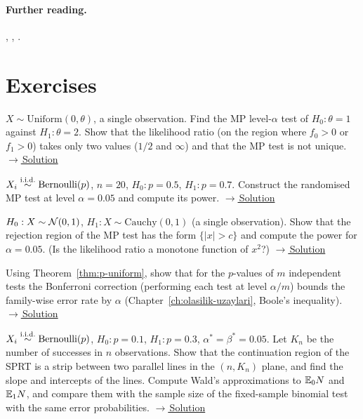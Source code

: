 \documentclass[main.tex]{subfiles}
\begin{document}
\paragraph{Further reading.} \cite[Chapter~8]{casella}, \cite[Chapter~3]{lehmann-romano}, \cite[Chapter~10]{wasserman}.

\section{Exercises}

\begin{exercise}\label{exr:13-1}
$X\sim\text{Uniform}(0,\theta)$, a single observation. Find the MP level-$\alpha$ test of $H_0:\theta=1$ against $H_1:\theta=2$. Show that the likelihood ratio (on the region where $f_0>0$ or $f_1>0$) takes only two values ($1/2$ and $\infty$) and that the MP test is not unique.
\hfill\hyperref[coz:13-1]{\footnotesize$\rightarrow$\,Solution}
\end{exercise}

\begin{exercise}\label{exr:13-2}
$X_i\overset{\text{i.i.d.}}{\sim}\text{Bernoulli}(p)$, $n=20$, $H_0:p=0.5$, $H_1:p=0.7$. Construct the randomised MP test at level $\alpha=0.05$ and compute its power.
\hfill\hyperref[coz:13-2]{\footnotesize$\rightarrow$\,Solution}
\end{exercise}

\begin{exercise}\label{exr:13-3}
$H_0:X\sim\mathcal{N}(0,1)$, $H_1:X\sim\text{Cauchy}(0,1)$ (a single observation). Show that the rejection region of the MP test has the form $\{|x|>c\}$ and compute the power for $\alpha=0.05$. (Is the likelihood ratio a monotone function of $x^2$?)
\hfill\hyperref[coz:13-3]{\footnotesize$\rightarrow$\,Solution}
\end{exercise}

\begin{exercise}\label{exr:13-4}
Using Theorem~\ref{thm:p-uniform}, show that for the $p$-values of $m$ independent tests the Bonferroni correction (performing each test at level $\alpha/m$) bounds the family-wise error rate by $\alpha$ (Chapter~\ref{ch:olasilik-uzaylari}, Boole's inequality).
\hfill\hyperref[coz:13-4]{\footnotesize$\rightarrow$\,Solution}
\end{exercise}

\begin{exercise}\label{exr:13-5}
$X_i\overset{\text{i.i.d.}}{\sim}\text{Bernoulli}(p)$, $H_0:p=0.1$, $H_1:p=0.3$, $\alpha^*=\beta^*=0.05$. Let $K_n$ be the number of successes in $n$ observations. Show that the continuation region of the SPRT is a strip between two parallel lines in the $(n,K_n)$ plane, and find the slope and intercepts of the lines. Compute Wald's approximations to $\mathbb{E}_0N$ and $\mathbb{E}_1N$, and compare them with the sample size of the fixed-sample binomial test with the same error probabilities.
\hfill\hyperref[coz:13-5]{\footnotesize$\rightarrow$\,Solution}
\end{exercise}
\end{document}
